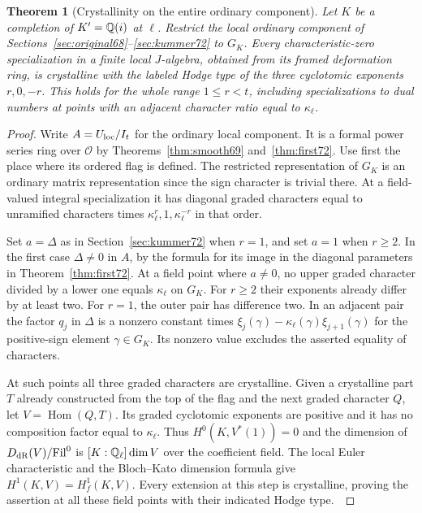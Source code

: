 \documentclass[a4paper,11pt]{article}
\newtheorem{theorem}[proposition]{Theorem}
\theoremstyle{definition}
\theoremstyle{remark}
\numberwithin{equation}{section}
\newcommand{\OO}{\mathcal O}
\begin{document}
\begin{theorem}[Crystallinity on the entire ordinary component]
\label{thm:crystalline121}
Let \(K\) be a completion of \(K'=\mathbb Q(i)\) at \(\ell\).
Restrict the local ordinary component of
Sections~\ref{sec:original68}--\ref{sec:kummer72} to \(G_K\).
Every characteristic-zero specialization in a finite local
\(J\)-algebra, obtained from its framed deformation ring, is
crystalline with the labeled Hodge type of the three
cyclotomic exponents \(r,0,-r\). This holds for the whole range
\(1\le r<t\), including specializations to dual numbers at
points with an adjacent character ratio equal to \(\kappa_\ell\).
\end{theorem}
\begin{proof}
Write \(A=U_{\rm loc}/I_t\) for the ordinary local component.
It is a formal power series ring over \(\OO\) by
Theorems~\ref{thm:smooth69} and~\ref{thm:first72}. Use first
the place where its ordered flag is defined. The restricted
representation of \(G_K\) is an ordinary matrix representation
since the sign character is trivial there. At a field-valued
integral specialization it has diagonal graded characters equal
to unramified characters times \(\kappa_\ell^r,1,\kappa_\ell^{-r}\)
in that order.

Set \(a=\Delta\) as in Section~\ref{sec:kummer72} when \(r=1\),
and set \(a=1\) when \(r\ge2\). In the first case \(\Delta\ne0\)
in \(A\), by the formula for its image in the diagonal parameters
in Theorem~\ref{thm:first72}. At a field point where \(a\ne0\),
no upper graded character divided by a lower one equals
\(\kappa_\ell\) on \(G_K\). For \(r\ge2\) their exponents
already differ by at least two. For \(r=1\), the outer pair
has difference two. In an adjacent pair the factor \(q_j\)
in \(\Delta\) is a nonzero constant times
\(\xi_j(\gamma)-\kappa_\ell(\gamma)\xi_{j+1}(\gamma)\)
for the positive-sign element \(\gamma\in G_K\). Its nonzero
value excludes the asserted equality of characters.

At such points all three graded characters are crystalline.
Given a crystalline part \(T\) already constructed from the
top of the flag and the next graded character \(Q\), let
\(V=\operatorname{Hom}(Q,T)\). Its graded cyclotomic exponents
are positive and it has no composition factor equal to
\(\kappa_\ell\). Thus \(H^0(K,V^*(1))=0\) and the dimension
of \(D_{\rm dR}(V)/\mathrm{Fil}^0\) is
\([K:\mathbb Q_\ell]\dim V\) over the coefficient field. The local
Euler characteristic and the Bloch--Kato dimension formula give
\(H^1(K,V)=H_f^1(K,V)\). Every extension at this step is
crystalline, proving the assertion at all these field points
with their indicated Hodge type.~\cite{VI-IV-VI-bk117}


\end{proof}
\end{document}
